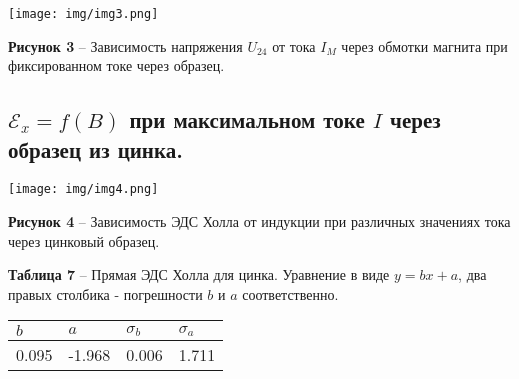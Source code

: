 \documentclass[12pt,a4paper]{article}
\begin{document}
        \texttt{[image: img/img3.png]}
	
	    \textbf{Рисунок 3} -- Зависимость напряжения $U_{24}$ от тока $I_M$ через обмотки магнита при фиксированном токе через образец.

		
	\subsection{$\mathcal{E}_x = f(B)$ при максимальном токе $I$ через образец из цинка.}
		\texttt{[image: img/img4.png]}
		
        \textbf{Рисунок 4} -- Зависимость ЭДС Холла от индукции при различных значениях тока через цинковый образец.
        
        \begin{table}[!h]
            \begin{flushleft}%
           		\textbf{Таблица 7} -- Прямая ЭДС Холла для цинка. Уравнение в виде $y = bx + a$, два правых столбика - погрешности $b$ и $a$ соответственно.\\
            \end{flushleft}
            \begin{center}
                \begin{tabular}{ | l | l | l | l |}
                    \hline
                    $b$     &   $a$    &   $\sigma_b$ &   $\sigma_a$\\
                    \hline
                    0.095   &   -1.968 &    0.006   &   1.711   \\
                    \hline    
                \end{tabular}
            \end{center}
        \end{table}
        
\end{document}
